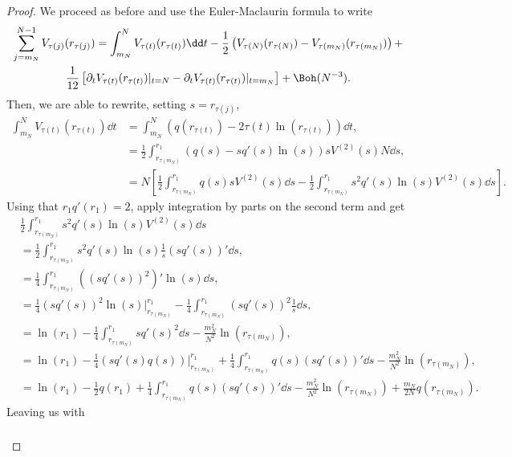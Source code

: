 \begin{proof}
We proceed as before and use the Euler-Maclaurin formula to write
\begin{multline}
	\sum_{j=m_N}^{N-1} V_{\tau(j)}(r_{\tau(j)}) = \int_{m_N}^N V_{\tau(t)}(r_{\tau(t)})  \dd t - \frac{1}{2} \left( V_{\tau(N)}(r_{\tau(N)})  - V_{\tau(m_N)}(r_{\tau(m_N)}) \right) + \\ \frac{1}{12} \left[ \partial_t V_{\tau(t)}(r_{\tau(t)}) |_{t=N} - \partial_t V_{\tau(t)}(r_{\tau(t)}) |_{t=m_N} \right] + \Boh(N^{-3}).
	\label{Equation: EulerMaclaurin 1 disk}
\end{multline}
Then, we are able to rewrite, setting $s = r_{\tau(j)}$,
\begin{align}
	\int_{m_N}^N V_{\tau(t)}(r_{\tau(t)})  \dd t & = \int_{m_N}^N (q(r_{\tau(t)}) - 2 \tau(t) \ln(r_{\tau(t)})) \dd t, \\
	& = \frac{1}{2} \int_{r_{\tau(m_N)}}^{r_1} (q(s) - s q'(s) \ln(s)) s V^{(2)}(s) N \dd s, \\
	& = N \left[  \frac{1}{2} \int_{r_{\tau(m_N)}}^{r_1} q(s) s V^{(2)}(s) \dd s -  \frac{1}{2} \int_{r_{\tau(m_N)}}^{r_1} s^2 q'(s) \ln(s) V^{(2)}(s) \dd s \right].
\end{align}
Using that $r_1 q'(r_1) = 2$, apply integration by parts on the second term and get
\begin{align}
	& \frac{1}{2} \int_{r_{\tau(m_N)}}^{r_1} s^2 q'(s) \ln(s) V^{(2)}(s) \dd s \\
	& = \frac{1}{2} \int_{r_{\tau(m_N)}}^{r_1} s^2 q'(s) \ln(s) \frac{1}{s} (s q'(s))' \dd s, \\
	& = \frac{1}{4} \int_{r_{\tau(m_N)}}^{r_1} ((sq'(s))^2)' \ln(s) \dd s, \\
	& = \frac{1}{4} (s q'(s))^2 \ln(s) |_{r_{\tau(m_N)}}^{r_1} - \frac{1}{4}  \int_{r_{\tau(m_N)}}^{r_1} (s q'(s))^2 \frac{1}{s} \dd s, \\
	& = \ln(r_1) - \frac{1}{4} \int_{r_{\tau(m_N)}}^{r_1} s q'(s)^2 \dd s - \frac{m_N^2}{N^2} \ln(r_{\tau(m_N)}), \\
	& = \ln(r_1) - \frac{1}{4} (s q'(s) q(s)) |_{r_{\tau(m_N)}}^{r_1} + \frac{1}{4} \int_{r_{\tau(m_N)}}^{r_1} q(s) (s q'(s))' \dd s  - \frac{m_N^2}{N^2} \ln(r_{\tau(m_N)}), \\
	& = \ln(r_1) - \frac{1}{2} q(r_1) + \frac{1}{4} \int_{r_{\tau(m_N)}}^{r_1} q(s) (s q'(s))'\dd s  - \frac{m_N^2}{N^2} \ln(r_{\tau(m_N)}) + \frac{m_N}{2 N} q(r_{\tau(m_N)}).
\end{align}
Leaving us with
\begin{align}
	& \begin{multlined}

\end{multlined}
\end{align}
\end{proof}
